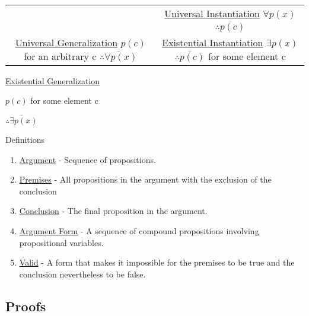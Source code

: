 \documentclass[12pt]{article}
\begin{document}
\begin{center}
\begin{tabular}{ c c }
&

\makecell{ \underline{Universal Instantiation} \\ $\forall p(x)$ \\ $\overline{\therefore{p(c)}}$ \\ \quad }

\\

\makecell{ \underline{Universal Generalization} \\ $p(c)$ for an arbitrary c \\ $\overline{\therefore{\forall p(x)}}$ \\ \quad}

&

\makecell{ \underline{Existential Instantiation} \\ $\exists p(x)$ \\ $\overline{\therefore{p(c)}}$ for some element c \\ \quad}

   
\end{tabular}

\quad

\quad

\underline{Existential Generalization}

$p(c)$ for some element c

 $\overline{\therefore{\exists p(x)}}$ 

\end{center}


Definitions
\begin{enumerate}
\item \underline{Argument} - Sequence of propositions.
\item \underline{Premises} - All propositions in the argument with the exclusion of the conclusion
\item \underline{Conclusion} - The final proposition in the argument.
\item \underline{Argument Form} - A sequence of compound propositions involving propositional variables.
\item \underline{Valid} - A form that makes it impossible for the premises to be true and the conclusion nevertheless to be false.
\end{enumerate}

\subsection{Proofs}
\end{document}

